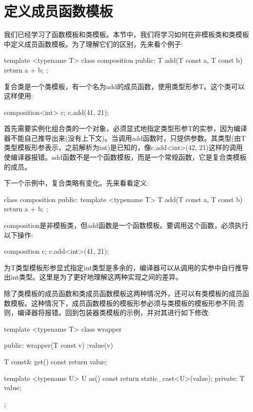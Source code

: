 \section{定义成员函数模板}
我们已经学习了函数模板和类模板。本节中，我们将学习如何在非模板类和类模板中定义成员函数模板。为了理解它们的区别，先来看个例子:

\begin{cpp}
template <typename T>
class composition
{
public:
	T add(T const a, T const b)
	{
		return a + b;
	}
};
\end{cpp}

复合类是一个类模板，有一个名为add的成员函数，使用类型形参T。这个类可以这样使用:

\begin{cpp}
composition<int> c;
c.add(41, 21);
\end{cpp}

首先需要实例化组合类的一个对象，必须显式地指定类型形参T的实参，因为编译器不能自己推导出来(没有上下文)。当调用add函数时，只提供参数。其类型(由T类型模板形参表示，之前解析为int)是已知的，像c.add<int>(42, 21)这样的调用使编译器报错。add函数不是一个函数模板，而是一个常规函数，它是复合类模板的成员。

下一个示例中，复合类略有变化。先来看看定义:

\begin{cpp}
class composition
{
public:
	template <typename T>
	T add(T const a, T const b)
	{
		return a + b;
	}
};
\end{cpp}

composition是非模板类，但add函数是一个函数模板。要调用这个函数，必须执行以下操作:

\begin{cpp}
composition c;
c.add<int>(41, 21);
\end{cpp}

为T类型模板形参显式指定int类型是多余的，编译器可以从调用的实参中自行推导出int类型。这里是为了更好地理解这两种实现之间的差异。

除了类模板的成员函数和类成员函数模板这两种情况外，还可以有类模板的成员函数模板。这种情况下，成员函数模板的模板形参必须与类模板的模板形参不同;否则，编译器将报错。回到包装器类模板的示例，并对其进行如下修改:

\begin{cpp}
template <typename T>
class wrapper
{
public:
	wrapper(T const v) :value(v)
	{}
	
	T const& get() const { return value; }
	
	template <typename U>
	U as() const
	{
		return static_cast<U>(value);
	}
private:
	T value;
};
\end{cpp}

